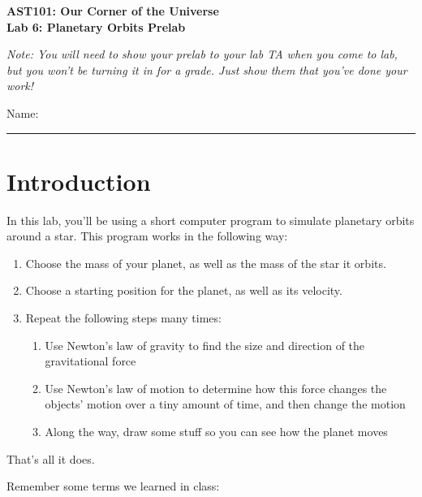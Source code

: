 \documentclass[11pt]{article}
\begin{document}
\begin{center}
\textbf{\Large
AST101: Our Corner of the Universe \\
\vspace*{0.1cm}
Lab 6: Planetary Orbits Prelab
}

\normalsize
\it Note: You will need to show your prelab to your lab TA when you come to lab, but you won't be turning it in for a grade. Just show them that you've done your work!
\end{center}

\vspace*{0.5cm}

{\Large Name:}\vspace*{0.5cm}\\\hrule

\vspace*{0.5cm}

\section{Introduction}

In this lab, you'll be using a short computer program to simulate planetary orbits around a star. This program works in the following way:

\begin{enumerate}
	\item Choose the mass of your planet, as well as the mass of the star it orbits.
	\item Choose a starting position for the planet, as well as its velocity. 
	\item Repeat the following steps many times:
	\begin{enumerate}
		\item Use Newton's law of gravity to find the size and direction of the gravitational force
		\item Use Newton's law of motion to determine how this force changes the objects' motion over a tiny amount of time, and then change the motion
		\item Along the way, draw some stuff so you can see how the planet moves
	\end{enumerate}
\end{enumerate}

That's all it does. 

Remember some terms we learned in class:
\end{document}
